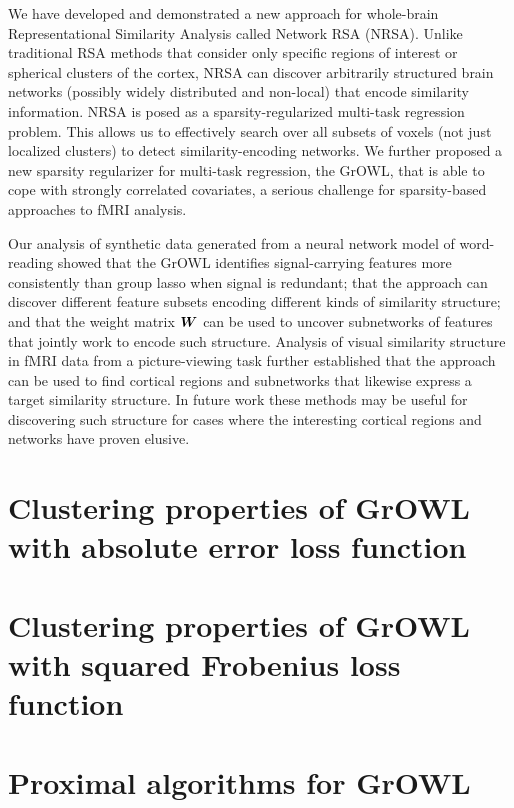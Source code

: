 \documentclass[journal]{IEEEtran}
\begin{document}
We have developed and demonstrated a new approach for whole-brain Representational Similarity Analysis called Network RSA (NRSA). Unlike traditional RSA methods that consider only specific regions of interest or spherical clusters of the cortex,  NRSA can discover arbitrarily structured brain networks (possibly widely distributed and non-local) that encode similarity information.  NRSA is posed as a sparsity-regularized multi-task regression problem. This allows us to effectively search over all subsets of voxels (not just localized clusters) to detect similarity-encoding networks.  We further proposed a new sparsity regularizer for multi-task regression, the GrOWL, that is able to cope with strongly correlated covariates, a serious challenge for sparsity-based approaches to fMRI analysis. 

Our analysis of synthetic data generated from a neural network model of word-reading showed that the GrOWL identifies signal-carrying features more consistently than group lasso when signal is redundant; that the approach can discover different feature subsets encoding different kinds of similarity structure; and that the weight matrix $\boldsymbol{W}$ can be used to uncover subnetworks of features that jointly work to encode such structure. Analysis of visual similarity structure in fMRI data from a picture-viewing task further established that the approach can be used to find cortical regions and subnetworks that likewise express a target similarity structure. In future work these methods may be useful for discovering such structure for cases where the interesting cortical regions and networks have proven elusive.

	\appendices
	
	\section{Clustering properties of GrOWL with absolute error loss function}
	
	
	\section{Clustering properties of GrOWL with squared Frobenius loss function}
	
	
	\section{Proximal algorithms for GrOWL}
	
	
\end{document}
